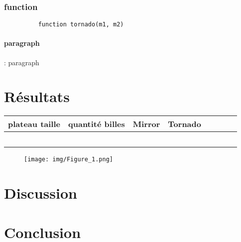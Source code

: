 \documentclass[utf8]{article}
\begin{document}
\subsubsection{function}

\begin{figure}[H]
\begin{minipage}{\textwidth}
  \centering	
	\begin{lstlisting}
	function tornado(m1, m2) 
    \end{lstlisting}
  \label{fig:code_exemple}
\end{minipage}
\end{figure}

\paragraph{paragraph}:
    paragraph
    
  

\section{Résultats}
\begin{center}
\begin{tabular}{|c|c|c|c|
                |c|c|c|c|}
\hline
plateau taille & quantité billes & Mirror & Tornado \\
\hline
              &                &       &\\
             &                &               & \\
             &                &               & \\
             &                &               & \\
\hline
             &                &              & \\
\hline
\end{tabular}
\end{center}



\begin{figure}[H]
  \centering
	\texttt{[image: img/Figure\_1.png]}
  \label{fig:logo}
\end{figure}

\newpage

\section{Discussion}
    

\section{Conclusion}
\end{document}
